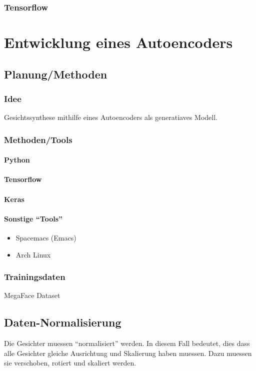 \subsection{Tensorflow}

\chapter{Entwicklung eines Autoencoders}

\section{Planung/Methoden}

\subsection{Idee}
Gesichtssynthese mithilfe eines Autoencoders als generatiaves Modell.

\subsection{Methoden/Tools}

\subsubsection{Python}
\subsubsection{Tensorflow}
\subsubsection{Keras}
\subsubsection{Sonstige ``Tools''}
\begin{itemize}
\item{Spacemacs (Emacs)}
\item{Arch Linux}
\end{itemize}

\subsection{Trainingsdaten}
MegaFace Dataset

\section{Daten-Normalisierung}
Die Gesichter muessen ``normalisiert'' werden. In diesem Fall bedeutet, dies
dass alle Gesichter gleiche Ausrichtung und Skalierung haben muessen. Dazu
muessen sie verschoben, rotiert und skaliert werden.

